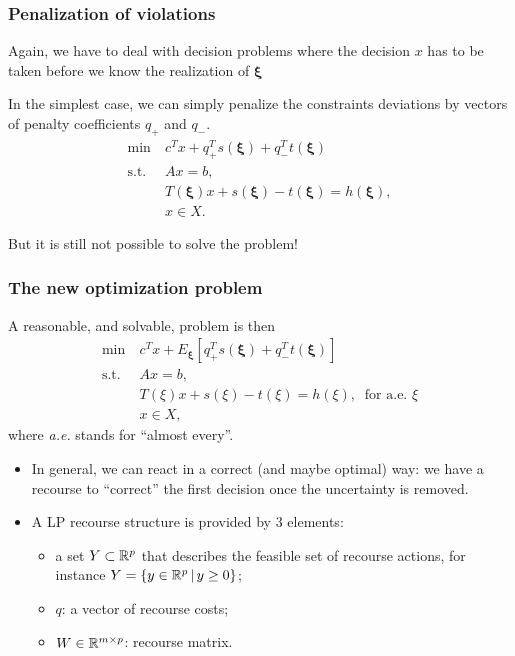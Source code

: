 \documentclass{beamer}
\def\bxi{\boldsymbol\xi}
\def\bxi{\boldsymbol\xi}
\begin{document}
\begin{frame}
	\frametitle{Penalization of violations}
	
	Again, we have to deal with decision problems where the decision $x$ has to be taken before we know the realization of $\bxi$
	
	In the simplest case, we can simply penalize the constraints deviations by vectors of penalty coefficients $q_+$ and $q_-$.
	\begin{align*}
	\min\ & c^Tx+q^T_+s(\bxi)+q^T_-t(\bxi) \\
	\mbox{s.t. } & Ax = b, \\
	& T(\bxi)x + s(\bxi)-t(\bxi) = h(\bxi), \\
	& x \in X.
	\end{align*}
	
	\mbox{}
	
	But it is still not possible to solve the problem!
	
\end{frame}

\begin{frame}
	\frametitle{The new optimization problem}
	
	A reasonable, and solvable, problem is then
	\begin{align*}
	\min\ & c^Tx+E_{\bxi}[q^T_+s(\bxi)+q^T_-t(\bxi)] \\
	\mbox{s.t. } & Ax = b, \\
	& T(\xi)x + s(\xi)-t(\xi) = h(\xi),\ \text{ for a.e. } \xi \\
	& x \in X,
	\end{align*}
where {\it a.e.} stands for ``almost every''.
	\begin{itemize}
		\item
		In general, we can react in a correct (and maybe optimal) way: we have a recourse to ``correct'' the first decision once the uncertainty is removed.
		\item
		A LP recourse structure is provided by 3 elements:
		\begin{itemize}
			\item
			a set $Y \subset {\mathbb{R}}^p$ that describes the feasible set of recourse actions, for instance $Y = \lbrace y \in {\mathbb{R}}^p \,|\, y \geq 0 \rbrace$;
			\item
			$q$: a vector of recourse costs;
			\item
			$W \in {\mathbb{R}}^{m \times p}$: {\blue recourse matrix}.
		\end{itemize}
	\end{itemize}
	
\end{frame}
\end{document}
